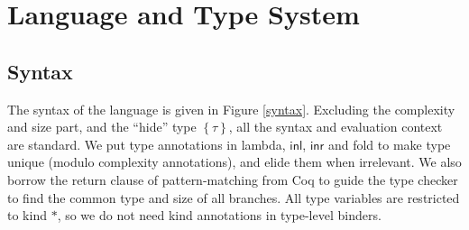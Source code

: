 \documentclass[preprint]{sigplanconf}
\newcommand{\thide}[1]{\left \{ #1 \right \}}
\newcommand{\syminl}{\mathsf{inl}}
\newcommand{\syminr}{\mathsf{inr}}
\begin{document}
\section{\label{section-lang}Language and Type System}

\subsection{Syntax}

The syntax of the language is given in Figure \ref{syntax}. Excluding the complexity and size part, and the ``hide'' type $\thide{\tau}$, all the syntax and evaluation context are standard. We put type annotations in lambda, $\syminl$, $\syminr$ and fold to make type unique (modulo complexity annotations), and elide them when irrelevant. We also borrow the return clause of pattern-matching from Coq to guide the type checker to find the common type and size of all branches. All type variables are restricted to kind $*$, so we do not need kind annotations in type-level binders.
\end{document}
